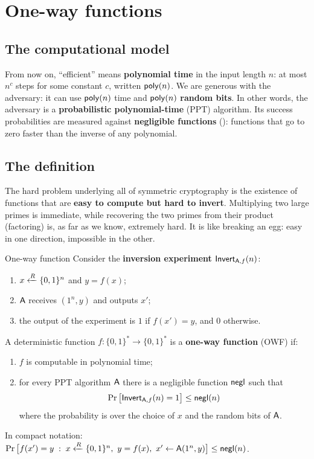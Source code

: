 
\section{One-way functions}

\subsection{The computational model}

From now on, ``efficient'' means \textbf{polynomial time} in the input length $n$: at most $n^c$ steps for some constant $c$, written $\mathsf{poly}(n)$. We are generous with the adversary: it can use $\mathsf{poly}(n)$ time and $\mathsf{poly}(n)$ \textbf{random bits}. In other words, the adversary is a \textbf{probabilistic polynomial-time} (PPT) algorithm. Its success probabilities are measured against \textbf{negligible functions} (): functions that go to zero faster than the inverse of any polynomial.

\subsection{The definition}

The hard problem underlying all of symmetric cryptography is the existence of functions that are \textbf{easy to compute but hard to invert}. Multiplying two large primes is immediate, while recovering the two primes from their product (factoring) is, as far as we know, extremely hard. It is like breaking an egg: easy in one direction, impossible in the other.

\begin{frameddefn}[label={def:owf}]{One-way function}
  Consider the \textbf{inversion experiment} $\mathsf{Invert}_{\mathsf{A},f}(n)$:
  \begin{enumerate}
    \item $x \xleftarrow{R} \{0,1\}^n$ and $y = f(x)$;
    \item $\mathsf{A}$ receives $(1^n, y)$ and outputs $x'$;
    \item the output of the experiment is $1$ if $f(x') = y$, and $0$ otherwise.
  \end{enumerate}
  A deterministic function $f : \{0,1\}^* \to \{0,1\}^*$ is a \textbf{one-way function} (OWF) if:
  \begin{enumerate}
    \item $f$ is computable in polynomial time;
    \item for every PPT algorithm $\mathsf{A}$ there is a negligible function $\mathsf{negl}$ such that
    \[
      \Pr\big[\mathsf{Invert}_{\mathsf{A},f}(n) = 1\big] \leq \mathsf{negl}(n)
    \]
    where the probability is over the choice of $x$ and the random bits of $\mathsf{A}$.
  \end{enumerate}
  In compact notation: $\Pr\big[f(x') = y \;:\; x \xleftarrow{R} \{0,1\}^n,\ y = f(x),\ x' \leftarrow \mathsf{A}(1^n, y)\big] \leq \mathsf{negl}(n)$.
\end{frameddefn}

